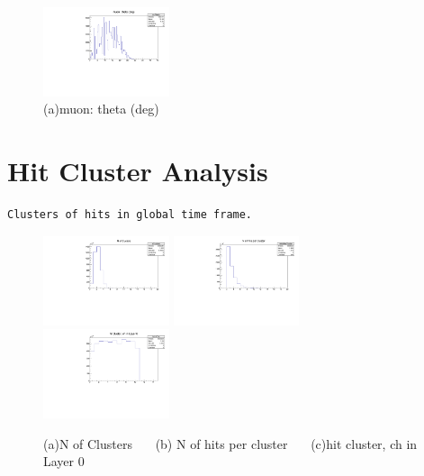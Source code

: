 \documentclass[a4paper,11pt]{article}
\theoremstyle{mytheor}
\begin{document}
\begin{figure}[H] 
\vspace*{-0.3cm} 
\includegraphics[width=0.33\textwidth,scale=0.5,trim=0 0 0 0,clip]{plotsdir/file0_test-muTheta-1.pdf} 
\caption{(a)muon: theta (deg) } 
\end{figure} 
\newpage 
\section{Hit Cluster Analysis} 
\begin{verbatim} 
Clusters of hits in global time frame. 
\end{verbatim} 
\begin{figure}[H] 
\vspace*{-0.3cm} 
\includegraphics[width=0.33\textwidth,scale=0.5,trim=0 0 0 0,clip]{plotsdir/file0_clusters-nClusters-1.pdf} 
\includegraphics[width=0.33\textwidth,scale=0.5,trim=0 0 0 0,clip]{plotsdir/file0_clusters-nHitsPerCluster-1.pdf} 
\includegraphics[width=0.33\textwidth,scale=0.5,trim=0 0 0 0,clip]{plotsdir/file0_clusters-hcL0Chs-1.pdf} 
\caption{(a)N of Clusters ~~~(b) N of hits per cluster ~~~(c)hit cluster, ch in Layer 0 } 
\end{figure} 
\end{document}
